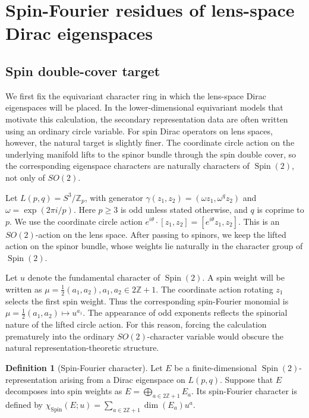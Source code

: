 \documentclass{article}
\theoremstyle{definition}
\newtheorem{definition}[theorem]{Definition}
\numberwithin{equation}{section}
\begin{document}
\section{Spin-Fourier residues of lens-space Dirac eigenspaces} \label{sec:spin-fourier-residues}



\subsection{Spin double-cover target}
\label{subsec:stage-1A-spin-cover-target}

We first fix the equivariant character ring in which the lens-space Dirac eigenspaces will be placed. In the lower-dimensional equivariant models that motivate this calculation, the secondary representation data are often written using an ordinary circle variable. For spin Dirac operators on lens spaces, however, the natural target is slightly finer. The coordinate circle action on the underlying manifold lifts to the spinor bundle through the spin double cover, so the corresponding eigenspace characters are naturally characters of $\operatorname{Spin}(2)$, not only of $SO(2)$.

Let $L(p,q)=S^3/\mathbb Z_p$, with generator $\gamma(z_1,z_2)=(\omega z_1,\omega^q z_2)$ and $\omega=\exp(2\pi i/p)$. Here $p\geq 3$ is odd unless stated otherwise, and $q$ is coprime to $p$. We use the coordinate circle action $e^{i\theta}\cdot [z_1,z_2]=[e^{i\theta}z_1,z_2]$. This is an $SO(2)$-action on the lens space. After passing to spinors, we keep the lifted action on the spinor bundle, whose weights lie naturally in the character group of $\operatorname{Spin}(2)$.






Let $u$ denote the fundamental character of $\operatorname{Spin}(2)$.  A spin weight will be written as $\mu=\frac12(a_1,a_2), a_1,a_2\in 2\mathbb Z+1.$ The coordinate action rotating $z_1$ selects the first spin weight.  Thus the corresponding spin-Fourier monomial is $\mu=\frac12(a_1,a_2) \longmapsto  u^{a_1}.$ The appearance of odd exponents reflects the spinorial nature of the lifted circle action.  For this reason, forcing the calculation prematurely into the ordinary $SO(2)$-character variable would obscure the natural representation-theoretic structure.

\begin{definition}[Spin-Fourier character]
Let $E$ be a finite-dimensional $\operatorname{Spin}(2)$-representation arising from a Dirac eigenspace on $L(p,q)$.  Suppose that $E$ decomposes into spin weights as $E=\bigoplus_{a\in 2\mathbb Z+1} E_a.$ Its spin-Fourier character is defined by $\chi_{\operatorname{Spin}}(E;u)=\sum_{a\in 2\mathbb Z+1} \dim(E_a)u^a.$ \end{definition}
\end{document}

